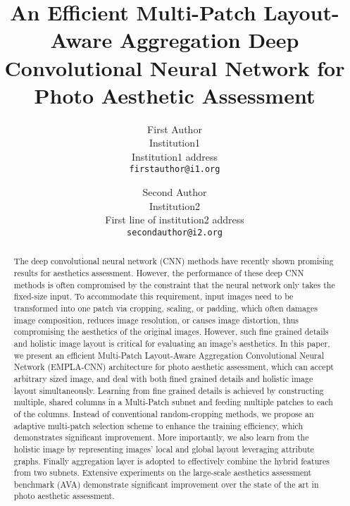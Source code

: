 \documentclass[10pt,twocolumn,letterpaper]{article}
\begin{document}
\title{An Efficient Multi-Patch Layout-Aware Aggregation Deep Convolutional Neural Network for Photo Aesthetic Assessment}

\author{First Author\\
Institution1\\
Institution1 address\\
{\tt\small firstauthor@i1.org}
\and
Second Author\\
Institution2\\
First line of institution2 address\\
{\tt\small secondauthor@i2.org}
}

\maketitle
\begin{abstract}	
	
The deep convolutional neural network (CNN) methods 
have recently shown promising results for aesthetics assessment. However, the performance of these deep CNN methods is often compromised by the constraint that the neural network only takes the fixed-size input. To accommodate this requirement, input images need to be transformed into one patch via cropping, scaling, or padding, which often damages image composition, reduces image resolution, or causes image distortion, thus compromising the aesthetics of the original images. However, such fine grained details and holistic image layout is critical for evaluating an image's aesthetics.
In this paper, we present an efficient Multi-Patch Layout-Aware Aggregation 
Convolutional Neural Network (EMPLA-CNN) architecture for photo aesthetic
assessment, which can accept arbitrary sized image, and deal with both fined grained details and holistic image layout simultaneously.
Learning from fine grained details is achieved by constructing multiple, shared columns in a Multi-Patch subnet and feeding multiple patches to each of the columns. Instead of conventional random-cropping methods, we propose an adaptive multi-patch selection scheme to enhance the training efficiency, which demonstrates significant improvement. More importantly, we also learn from the holistic image by representing images' local and global layout leveraging attribute graphs. Finally aggregation layer is adopted to effectively combine the hybrid features from two subnets.
Extensive experiments on the large-scale aesthetics assessment benchmark (AVA) demonstrate significant improvement over the state of the art in photo aesthetic assessment. 

\end{abstract}
\end{document}
